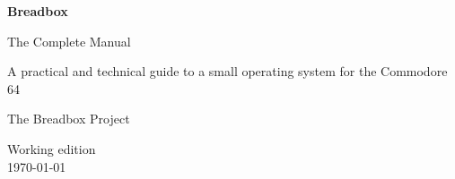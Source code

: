 \begin{titlepage}
  \centering
  \vspace*{25mm}
  {\Huge\bfseries Breadbox\par}
  \vspace{4mm}
  {\LARGE The Complete Manual\par}
  \vspace{18mm}
  {\Large A practical and technical guide to a small operating system for the Commodore 64\par}
  \vfill
  {\large The Breadbox Project\par}
  \vspace{3mm}
  {\normalsize Working edition\\
  \today\par}
  \vspace*{15mm}
\end{titlepage}
\thispagestyle{empty}
\cleardoublepage
